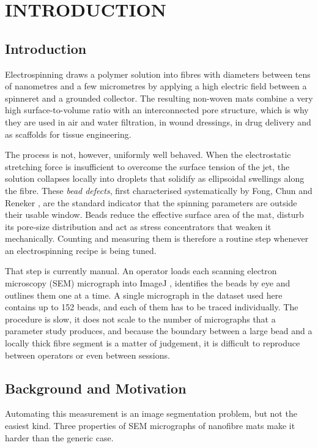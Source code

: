 \chapter{INTRODUCTION}
\label{ch:introduction}

\section{Introduction}

Electrospinning draws a polymer solution into fibres with diameters between tens of
nanometres and a few micrometres by applying a high electric field between a
spinneret and a grounded collector. The resulting non-woven mats combine a very
high surface-to-volume ratio with an interconnected pore structure, which is why
they are used in air and water filtration, in wound dressings, in drug delivery
and as scaffolds for tissue engineering.

The process is not, however, uniformly well behaved. When the electrostatic
stretching force is insufficient to overcome the surface tension of the jet, the
solution collapses locally into droplets that solidify as ellipsoidal swellings
along the fibre. These \emph{bead defects}, first characterised systematically by
Fong, Chun and Reneker \cite{fong1999beaded}, are the standard indicator that the
spinning parameters are outside their usable window. Beads reduce the effective
surface area of the mat, disturb its pore-size distribution and act as stress
concentrators that weaken it mechanically. Counting and measuring them is therefore
a routine step whenever an electrospinning recipe is being tuned.

That step is currently manual. An operator loads each scanning electron microscopy
(SEM) micrograph into ImageJ \cite{schindelin2012fiji}, identifies the beads by eye
and outlines them one at a time. A single micrograph in the dataset used here
contains up to 152 beads, and each of them has to be traced individually. The
procedure is slow, it does not scale to the number of micrographs that a parameter
study produces, and because the boundary between a large bead and a locally thick
fibre segment is a matter of judgement, it is difficult to reproduce between
operators or even between sessions.

\section{Background and Motivation}

Automating this measurement is an image segmentation problem, but not the easiest
kind. Three properties of SEM micrographs of nanofibre mats make it harder than the
generic case.


